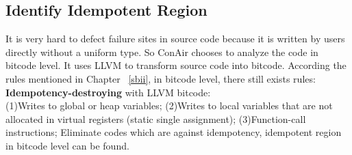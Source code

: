 \subsection{Identify Idempotent Region}
It is very hard to defect failure sites in source code because it is written by users directly without a uniform type. So ConAir chooses to analyze the code in bitcode level. It uses LLVM to transform source code into bitcode. According the rules mentioned in Chapter ~\ref{sbii}, in bitcode level, there still exists rules:\\
\textbf{Idempotency-destroying} with LLVM bitcode:\\
(1)Writes to global or heap variables;
(2)Writes to local variables that are not allocated in virtual registers (static single assignment);
(3)Function-call instructions;
Eliminate codes which are against idempotency, idempotent region in bitcode level can be found.
